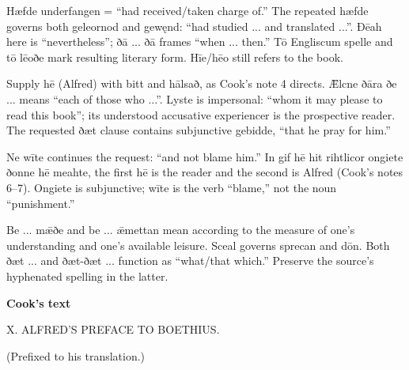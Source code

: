 Hæfde underfangen = “had received/\allowbreak{}taken charge of.” The repeated hæfde governs both geleornod and gewęnd: “had studied ... and translated ...”. Ðēah here is “nevertheless”; ðā ... ðā frames “when ... then.” Tō Engliscum spelle and tō lēoðe mark resulting literary form. Hīe/\allowbreak{}hēo still refers to the book.

Supply hē (Alfred) with bitt and hālsað, as Cook’s note 4 directs. Ǣlcne ðāra ðe ... means “each of those who ...”. Lyste is impersonal: “whom it may please to read this book”; its understood accusative experiencer is the prospective reader. The requested ðæt clause contains subjunctive gebidde, “that he pray for him.”

Ne wīte continues the request: “and not blame him.” In gif hē hit rihtlicor ongiete ðonne hē meahte, the first hē is the reader and the second is Alfred (Cook’s notes 6–7). Ongiete is subjunctive; wīte is the verb “blame,” not the noun “punishment.”

Be ... mǣðe and be ... ǣmettan mean according to the measure of one’s understanding and one’s available leisure. Sceal governs sprecan and dōn. Both ðæt ... and ðæt-ðæt ... function as “what/\allowbreak{}that which.” Preserve the source’s hyphenated spelling in the latter.

\textbf{Cook’s text}

X. ALFRED’S PREFACE TO BOETHIUS.

(Prefixed to his translation.)

